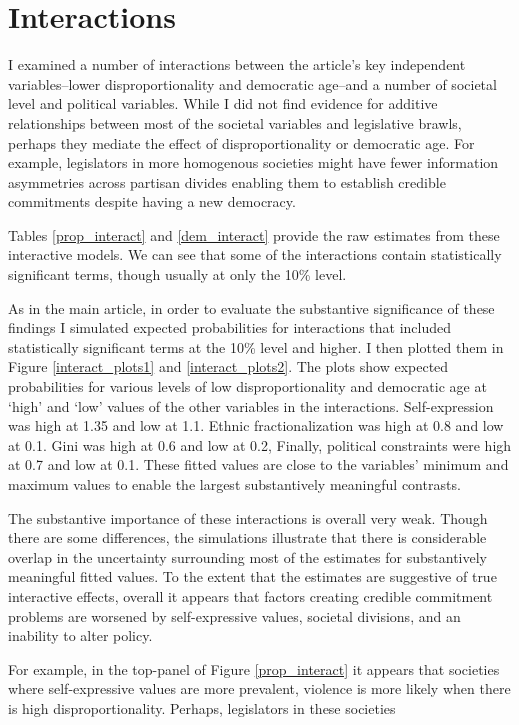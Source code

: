 \documentclass[a4paper]{article}\usepackage[]{graphicx}\usepackage[]{color}
\begin{document}
\section*{Interactions}


I examined a number of interactions between the article's key independent variables--lower disproportionality and democratic age--and a number of societal level and political variables. While I did not find evidence for additive relationships between most of the societal variables and legislative brawls, perhaps they mediate the effect of disproportionality or democratic age. For example, legislators in more homogenous societies might have fewer information asymmetries across partisan divides enabling them to establish credible commitments despite having a new democracy.

Tables \ref{prop_interact} and \ref{dem_interact} provide the raw estimates from these interactive models. We can see that some of the interactions contain statistically significant terms, though usually at only the 10\% level.

As in the main article, in order to evaluate the substantive significance of these findings I simulated expected probabilities for interactions that included statistically significant terms at the 10\% level and higher. I then plotted them in Figure \ref{interact_plots1} and \ref{interact_plots2}. The plots show expected probabilities for various levels of low disproportionality and democratic age at `high' and `low' values of the other variables in the interactions. Self-expression was high at 1.35 and low at 1.1. Ethnic fractionalization was high at 0.8 and low at 0.1. Gini was high at 0.6 and low at 0.2, Finally, political constraints were high at 0.7 and low at 0.1.
These fitted values are close to the variables' minimum and maximum values to enable the largest substantively meaningful contrasts.

The substantive importance of these interactions is overall very weak. Though there are some differences, the simulations illustrate that there is considerable overlap in the uncertainty surrounding most of the estimates for substantively meaningful fitted values. To the extent that the estimates are suggestive of true interactive effects, overall it appears that factors creating credible commitment problems are worsened by self-expressive values, societal divisions, and an inability to alter policy.

For example, in the top-panel of Figure \ref{prop_interact} it appears that societies where self-expressive values are more prevalent, violence is more likely when there is high disproportionality. Perhaps, legislators in these societies
\end{document}
